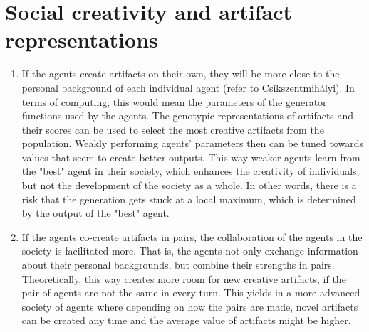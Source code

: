 \documentclass[english]{tktltiki}
\begin{document}
    \section{Social creativity and artifact representations}
    
    \begin{enumerate}[label=(\alph*)]
        \item If the agents create artifacts on their own, they will be more close to the personal background of each individual agent (refer to Cs\'ikszentmih\'alyi). In terms of computing, this would mean the parameters of the generator functions used by the agents. The genotypic representations of artifacts and their scores can be used to select the most creative artifacts from the population. Weakly performing agents' parameters then can be tuned towards values that seem to create better outputs. This way weaker agents learn from the "best" agent in their society, which enhances the creativity of individuals, but not the development of the society as a whole. In other words, there is a risk that the generation gets stuck at a local maximum, which is determined by the output of the "best" agent.

        \item If the agents co-create artifacts in pairs, the collaboration of the agents in the society is facilitated more. That is, the agents not only exchange information about their personal backgrounds, but combine their strengths in pairs. Theoretically, this way creates more room for new creative artifacts, if the pair of agents are not the same in every turn. This yields in a more advanced society of agents where depending on how the pairs are made, novel artifacts can be created any time and the average value of artifacts might be higher. 
    \end{enumerate}
    
    
\end{document}
